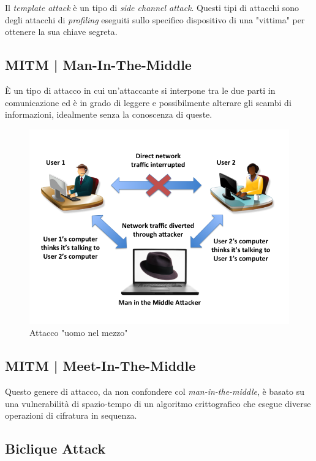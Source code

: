 \textsf{\small Il \emph{template attack} è un tipo di \emph{side channel attack}. Questi tipi di attacchi sono degli attacchi di \emph{profiling} eseguiti sullo specifico dispositivo di una "vittima" per ottenere la sua chiave segreta. }

\subsection{MITM | Man-In-The-Middle}

 

\textsf{\small È un tipo di attacco in cui un'attaccante si interpone tra le due parti in comunicazione ed è in grado di leggere e possibilmente alterare gli scambi di informazioni, idealmente senza la conoscenza di queste. }

\begin{figure}[H]
	\centering
	\includegraphics[width=.6\textwidth, height=.6\textheight, keepaspectratio]{./images/attacks/man_in_the_middle.png}
	\caption{Attacco "uomo nel mezzo"}
	\label{fig:man_in_the_middle}
\end{figure}

\subsection{MITM | Meet-In-The-Middle}

 

\textsf{\small Questo genere di attacco, da non confondere col \emph{man-in-the-middle}, è basato su una vulnerabilità di spazio-tempo di un algoritmo crittografico che esegue diverse operazioni di cifratura in sequenza.}

\subsection{Biclique Attack}

